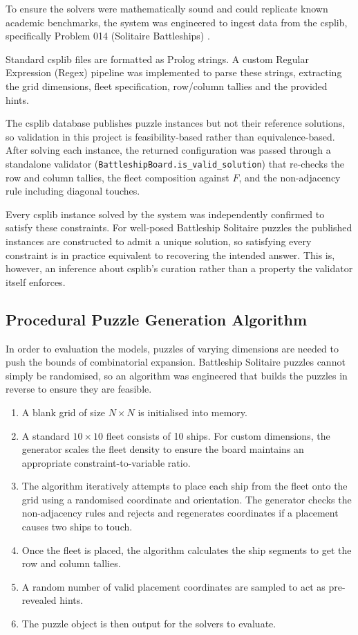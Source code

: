 To ensure the solvers were mathematically sound and could replicate known academic benchmarks, the system was engineered to ingest data from the \gls{csplib}, specifically Problem 014 (Solitaire Battleships) \citep{csplib:prob014}.

Standard \gls{csplib} files are formatted as Prolog strings. A custom Regular Expression (Regex) pipeline was implemented to parse these strings, extracting the grid dimensions, fleet specification, row/column tallies and the provided hints.

The \gls{csplib} database publishes puzzle instances but not their reference solutions, so validation in this project is feasibility-based rather than equivalence-based. After solving each instance, the returned configuration was passed through a standalone validator (\verb|BattleshipBoard.is_valid_solution|) that re-checks the row and column tallies, the fleet composition against $F$, and the non-adjacency rule including diagonal touches.

Every \gls{csplib} instance solved by the system was independently confirmed to satisfy these constraints. For well-posed Battleship Solitaire puzzles the published instances are constructed to admit a unique solution, so satisfying every constraint is in practice equivalent to recovering the intended answer. This is, however, an inference about \gls{csplib}'s curation rather than a property the validator itself enforces.

\subsection{Procedural Puzzle Generation Algorithm}\label{subsec:procedural-puzzle-gen-algo}
In order to evaluation the models, puzzles of varying dimensions are needed to push the bounds of combinatorial expansion. Battleship Solitaire puzzles cannot simply be randomised, so an algorithm was engineered that builds the puzzles in reverse to ensure they are feasible.

\begin{enumerate}
    \item A blank grid of size $N \times N$ is initialised into memory.
    \item A standard $10 \times 10$ fleet consists of 10 ships. For custom dimensions, the generator scales the fleet density to ensure the board maintains an appropriate constraint-to-variable ratio.
    \item The algorithm iteratively attempts to place each ship from the fleet onto the grid using a randomised coordinate and orientation. The generator checks the non-adjacency rules and rejects and regenerates coordinates if a placement causes two ships to touch.
    \item Once the fleet is placed, the algorithm calculates the ship segments to get the row and column tallies.
    \item A random number of valid placement coordinates are sampled to act as pre-revealed hints.
    \item The puzzle object is then output for the solvers to evaluate.
\end{enumerate}

